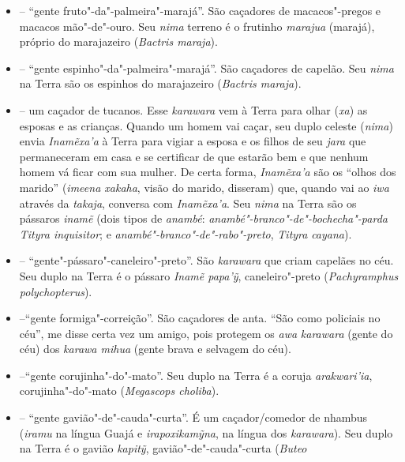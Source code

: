 \begin{itemize}
  dos brancos, \emph{karai janaha} (``canto dos brancos''). Seu duplo
  terreno é a ave \emph{pukua}, pomba"-trocal (\emph{Patagioenas
  speciosa}).
\item
  \emph{} -- ``gente fruto"-da"-palmeira"-marajá''. São
  caçadores de macacos"-pregos e macacos mão"-de"-ouro. Seu \emph{nima}
  terreno é o frutinho \emph{marajua} (marajá), próprio do marajazeiro
  (\emph{Bactris maraja}).
\item
  \emph{} -- ``gente espinho"-da"-palmeira"-marajá''. São
  caçadores de capelão. Seu \emph{nima} na Terra são os espinhos do
  marajazeiro (\emph{Bactris maraja}).
\item
  \emph{} -- um caçador de tucanos. Esse \emph{karawara}
  vem à Terra para olhar (\emph{xa}) as esposas e as crianças. Quando um
  homem vai caçar, seu duplo celeste (\emph{nima}) envia
  \emph{Inamẽxa'a} à Terra para vigiar a esposa e os filhos de
  seu \emph{jara} que permaneceram em casa e se certificar de que
  estarão bem e que nenhum homem vá ficar com sua mulher. De certa
  forma, \emph{Inamẽxa'a} são os ``olhos dos marido''
  (\emph{imeena xakaha}, visão do marido, disseram) que, quando vai ao
  \emph{iwa} através da \emph{takaja}, conversa com
  \emph{Inamẽxa'a}. Seu \emph{nima} na Terra são os pássaros
  \emph{inamẽ} (dois tipos de \emph{anambé}:
  \emph{anambé"-branco"-de"-bochecha"-parda} \emph{Tityra inquisitor}; e
  \emph{anambé"-branco"-de"-rabo"-preto}, \emph{Tityra} \emph{cayana}).
\item
  \emph{} -- ``gente"-pássaro"-caneleiro"-preto''. São
  \emph{karawara} que criam capelães no céu. Seu duplo na Terra é o
  pássaro \emph{Inamẽ papa'ỹ}, caneleiro"-preto (\emph{Pachyramphus
  polychopterus}).
\item
  \emph{} --``gente formiga"-correição''. São caçadores de
  anta. ``São como policiais no céu'', me disse certa vez um amigo, pois
  protegem os \emph{awa} \emph{karawara} (gente do céu) dos \emph{karawa
  mihua} (gente brava e selvagem do céu).
\item
   --``gente corujinha"-do"-mato''. Seu duplo
  na Terra é a coruja \emph{arakwari'ia}, corujinha"-do"-mato
  (\emph{Megascops choliba}).
\item
  \emph{} -- ``gente gavião"-de"-cauda"-curta''. É um
  caçador/comedor de nhambus (\emph{iramu} na língua Guajá e
  \emph{irapoxikamỹna}, na língua dos \emph{karawara}). Seu duplo na
  Terra é o gavião \emph{kapitỹ}, gavião"-de"-cauda"-curta (\emph{Buteo
}
\end{itemize}
